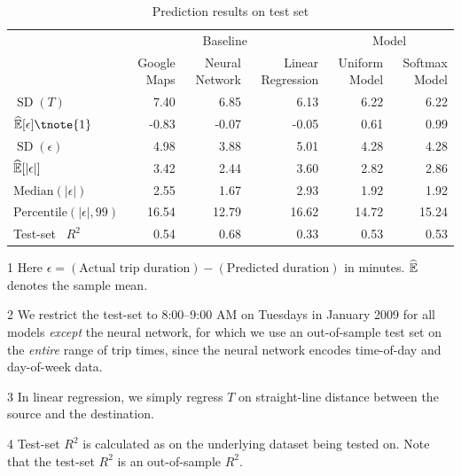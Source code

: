 \documentclass{article}
\newcommand{\sd}{\operatorname{SD}}
\begin{document}


\begin{table}[h!]
\centering
\begin{threeparttable}
\begin{tabular}{lrrrrr}
\toprule
& \multicolumn{3}{c}{Baseline} & \multicolumn{2}{c}{Model} \\\cmidrule(r){2-4} \cmidrule(l){5-6} 
{} & Google Maps & Neural Network\tnote{2} & Linear Regression\tnote{3} & Uniform Model & Softmax Model \\
\midrule
$\sd(T)$ & 7.40 & 6.85& 6.13&  6.22 & 6.22 \\ [1em]
$\hat \E[\epsilon]\tnote{1}$ & -0.83 &-0.07 & -0.05&  0.61 & 0.99 \\
$\sd(\epsilon)$ & 4.98 & 3.88& 5.01&  4.28 & 4.28 \\[1em]
$\widehat {\mathbb{E}}[|\epsilon|]$ & 3.42 & 2.44& 3.60&  2.82 & 2.86 \\
$\text{Median}(|\epsilon|)$ & 2.55 & 1.67& 2.93 &  1.92 & 1.92 \\
$\text{Percentile}(|\epsilon|, 99)$ & 16.54 &12.79 & 16.62&  14.72 & 15.24 \\ [1em]
Test-set\tnote{4}  \, $R^2$ & 0.54 & 0.68& 0.33 & 0.53 & 0.53 \\
\bottomrule
\end{tabular}
\caption{Prediction results on test set}
\label{tab:mainres}
\begin{tablenotes}
\item[1] Here $\epsilon = (\text{Actual trip duration}) - (\text{Predicted duration})$ in minutes. $\widehat {\mathbb{E}}$ denotes the sample mean. 
\item[2] We restrict the test-set to 8:00--9:00 AM on Tuesdays in January 2009 for all models \emph{except} the neural network, for which we use an out-of-sample test set on the \emph{entire} range of trip times, since the neural network encodes time-of-day and day-of-week data. 
\item[3]In linear regression, we simply regress $T$ on straight-line distance between the source and the destination.  
\item[4] Test-set $R^2$ is calculated as  on the underlying dataset being tested on. Note that the test-set $R^2$ is an out-of-sample $R^2$. 
\end{tablenotes}
\end{threeparttable}
\end{table}
\end{document}
